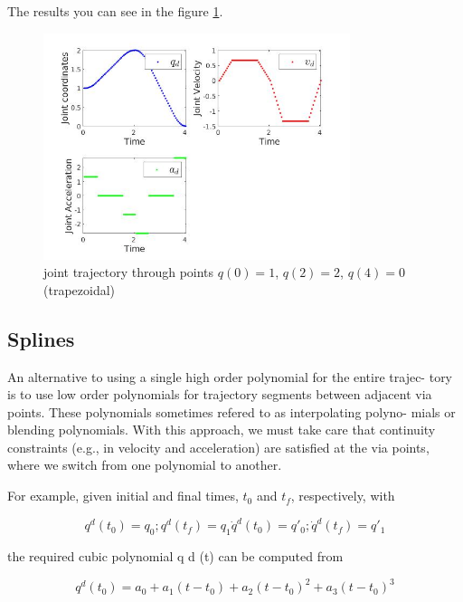 \documentclass[12pt, a4paper]{report}
\begin{document}
The results you can see in the figure \ref{fig:mesh6}.

\begin{figure}[H]
	\centering
		\includegraphics[width=0.8\textwidth]{22} %
	\caption{joint trajectory through points $q(0) = 1$, $q(2) = 2$, $q(4) = 0$ (trapezoidal)} %
	\label{fig:mesh6}
\end{figure}


{\centering
\subsection*{Splines}
}
%

An alternative to using a single high order polynomial for the entire trajec-
tory is to use low order polynomials for trajectory segments between adjacent
via points. These polynomials sometimes refered to as interpolating polyno-
mials or blending polynomials. With this approach, we must take care that
continuity constraints (e.g., in velocity and acceleration) are satisfied at the via
points, where we switch from one polynomial to another.

For example, given initial and final times, $t_0$ and $t_f$, respectively, with 

\begin{equation}
	q^d(t_0) = q_0	;	q^d(t_f) = q_1
	\dot{q}^d(t_0) = q'_0	;	\dot{q}^d(t_f) = q'_1
\end{equation}

the required cubic polynomial q d (t) can be computed from

\begin{equation}
	q^d(t_0) = a_0 + a_1(t-t_0) + a_2(t-t_0)^2 +a_3(t-t_0)^3
\end{equation}
\end{document}
